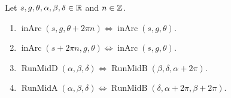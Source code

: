 \begin{lemma}\label{pc:lem:shift}
Let $s,g,\theta,\alpha,\beta,\delta\in\mathbb R$ and $n\in\mathbb Z$.
\begin{enumerate}[label=(\alph*)]
\item $\operatorname{inArc}(s,g,\theta+2\pi n)\iff\operatorname{inArc}(s,g,\theta)$.
\item $\operatorname{inArc}(s+2\pi n,g,\theta)\iff\operatorname{inArc}(s,g,\theta)$.
\item $\operatorname{RunMidD}(\alpha,\beta,\delta)\iff\operatorname{RunMidB}(\beta,\delta,\alpha+2\pi)$.
\item $\operatorname{RunMidA}(\alpha,\beta,\delta)\iff\operatorname{RunMidB}(\delta,\alpha+2\pi,\beta+2\pi)$.
\end{enumerate}
\end{lemma}


